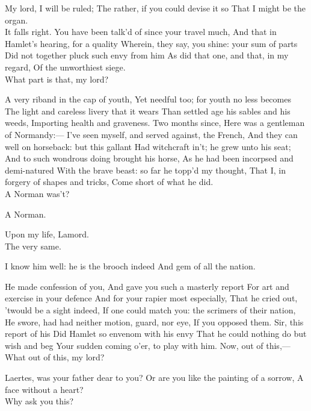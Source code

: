 \documentclass[11pt]{book}
\begin{document}
\7	My lord, I will be ruled;
	The rather, if you could devise it so
	That I might be the organ. \\

\2	It falls right.
	You have been talk'd of since your travel much,
	And that in Hamlet's hearing, for a quality
	Wherein, they say, you shine: your sum of parts
	Did not together pluck such envy from him
	As did that one, and that, in my regard,
	Of the unworthiest siege. \\

\7	What part is that, my lord?

\2	A very riband in the cap of youth,
	Yet needful too; for youth no less becomes
	The light and careless livery that it wears
	Than settled age his sables and his weeds,
	Importing health and graveness. Two months since,
	Here was a gentleman of Normandy:---
	I've seen myself, and served against, the French,
	And they can well on horseback: but this gallant
	Had witchcraft in't; he grew unto his seat;
	And to such wondrous doing brought his horse,
	As he had been incorpsed and demi-natured
	With the brave beast: so far he topp'd my thought,
	That I, in forgery of shapes and tricks,
	Come short of what he did. \\

\7	A Norman was't?

\2	A Norman.

\7	Upon my life, Lamord. \\

\2	The very same.

\7	I know him well: he is the brooch indeed
	And gem of all the nation.

\2	He made confession of you,
	And gave you such a masterly report
	For art and exercise in your defence
	And for your rapier most especially,
	That he cried out, 'twould be a sight indeed,
	If one could match you: the scrimers of their nation,
	He swore, had had neither motion, guard, nor eye,
	If you opposed them. Sir, this report of his
	Did Hamlet so envenom with his envy
	That he could nothing do but wish and beg
	Your sudden coming o'er, to play with him.
	Now, out of this,--- \\

\7	What out of this, my lord?

\2	Laertes, was your father dear to you?
	Or are you like the painting of a sorrow,
	A face without a heart? \\

\7	Why ask you this?
\end{document}
